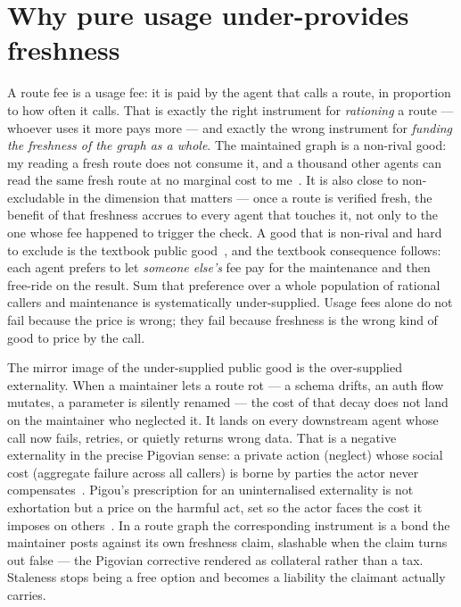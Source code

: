 \documentclass[11pt]{article}
\begin{document}
\section{Why pure usage under-provides freshness}

A route fee is a usage fee: it is paid by the agent that calls a route, in
proportion to how often it calls. That is exactly the right instrument for
\emph{rationing} a route --- whoever uses it more pays more --- and exactly the
wrong instrument for \emph{funding the freshness of the graph as a whole}. The
maintained graph is a non-rival good: my reading a fresh route does not consume
it, and a thousand other agents can read the same fresh route at no marginal cost
to me~\cite{samuelson}. It is also close to non-excludable in the dimension that
matters --- once a route is verified fresh, the benefit of that freshness accrues
to every agent that touches it, not only to the one whose fee happened to trigger
the check. A good that is non-rival and hard to exclude is the textbook public
good~\cite{samuelson}, and the textbook consequence follows: each agent prefers to
let \emph{someone else's} fee pay for the maintenance and then free-ride on the
result. Sum that preference over a whole population of rational callers and
maintenance is systematically under-supplied. Usage fees alone do not fail because
the price is wrong; they fail because freshness is the wrong kind of good to price
by the call.

The mirror image of the under-supplied public good is the over-supplied
externality. When a maintainer lets a route rot --- a schema drifts, an auth flow
mutates, a parameter is silently renamed --- the cost of that decay does not land
on the maintainer who neglected it. It lands on every downstream agent whose call
now fails, retries, or quietly returns wrong data. That is a negative
externality in the precise Pigovian sense: a private action (neglect) whose social
cost (aggregate failure across all callers) is borne by parties the actor never
compensates~\cite{pigou}. Pigou's prescription for an uninternalised externality
is not exhortation but a price on the harmful act, set so the actor faces the cost
it imposes on others~\cite{pigou}. In a route graph the corresponding instrument
is a bond the maintainer posts against its own freshness claim, slashable when the
claim turns out false --- the Pigovian corrective rendered as collateral rather
than a tax. Staleness stops being a free option and becomes a liability the
claimant actually carries.
\end{document}
